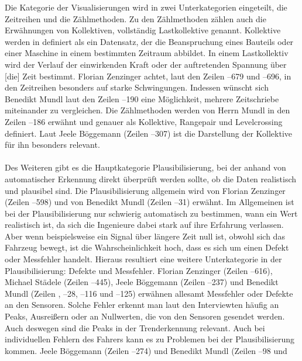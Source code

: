 Die Kategorie der Visualisierungen wird in zwei Unterkategorien eingeteilt, die Zeitreihen und die Zählmethoden. Zu den Zählmethoden zählen auch die Erwähnungen von \glqq Kollektiven\grqq{}, vollständig Lastkollektive genannt. Kollektive werden in \cite{Jacobs.2016} definiert als \glqq ein Datensatz, der die Beanspruchung eines Bauteils oder einer Maschine in einem bestimmten Zeitraum abbildet. In einem Lastkollektiv wird der Verlauf der einwirkenden Kraft oder der auftretenden Spannung über [die] Zeit bestimmt\grqq{}. Florian Zenzinger achtet, laut den Zeilen --679 und --696, in den Zeitreihen besonders auf starke Schwingungen. Indessen wünscht sich Benedikt Mundl laut den Zeilen --190 eine Möglichkeit, mehrere Zeitschriebe miteinander zu vergleichen. Die Zählmethoden werden von Herrn Mundl in den Zeilen --186 erwähnt und genauer als Kollektive, Rangepair und Levelcrossing definiert. Laut Jeele Böggemann (Zeilen --307) ist die Darstellung der Kollektive für ihn besonders relevant. \\\\ Des Weiteren gibt es die Hauptkategorie Plausibilisierung, bei der anhand von automatischer Erkennung direkt überprüft werden sollte, ob die Daten  realistisch und plausibel sind. Die Plausibilisierung allgemein wird von Florian Zenzinger (Zeilen --598) und von Benedikt Mundl (Zeilen --31) erwähnt. Im Allgemeinen ist bei der Plausibilisierung nur schwierig automatisch zu bestimmen, wann ein Wert realistisch ist, da sich die Ingenieure dabei stark auf ihre Erfahrung verlassen. Aber wenn beispielsweise ein Signal über längere Zeit null ist, obwohl sich das Fahrzeug  bewegt, ist die Wahrscheinlichkeit  hoch, dass es sich um einen Defekt oder Messfehler handelt. Hieraus resultiert eine weitere Unterkategorie in der Plausibilisierung: Defekte und Messfehler. Florian Zenzinger (Zeilen --616), Michael Städele (Zeilen --445), Jeele Böggemann (Zeilen --237) und Benedikt Mundl (Zeilen , --28, --116 und --125) erwähnen allesamt Messfehler oder Defekte an den Sensoren. Solche Fehler erkennt man laut den Interviewten häufig an Peaks, Ausreißern oder an Nullwerten, die von den Sensoren gesendet werden. Auch deswegen sind die Peaks in der Trenderkennung  relevant. Auch bei individuellen Fehlern des Fahrers kann es zu Problemen bei der Plausibilisierung kommen. Jeele Böggemann (Zeilen --274) und Benedikt Mundl (Zeilen --98 und 